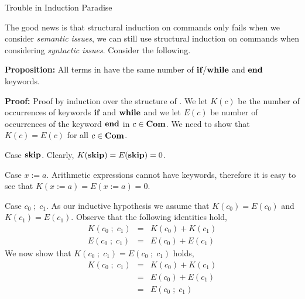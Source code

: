\documentclass{beamer}
\begin{document}
\begin{frame}[fragile]{Trouble in Induction Paradise}

\scriptsize
The good news is that structural induction on commands only fails when we consider {\em semantic issues}, we
can still use structural induction on commands when considering {\em syntactic issues}.  Consider the following.

\vspace{.1in}
{\bf Proposition:}  All terms in  have the same number of $\mbox{\bf if}$/$\mbox{\bf while}$ and $\mbox{\bf end}$
keywords.

\vspace{.1in}
{\bf Proof:} Proof by induction over the structure of .  We let $K(c)$ be the number of
occurrences of keywords $\mbox{\bf if}$ and $\mbox{\bf while}$ and we let $E(c)$
be number of occurrences of the keyword $\mbox{\bf end}$ in $c\in\mbox{\bf Com}$.  We need to show that
$K(c) = E(c)$ for all $c\in\mbox{\bf Com}$.

\vspace{.1in}
Case $\mbox{\bf skip}$.  Clearly, $K(\mbox{\bf skip}) = E(\mbox{\bf skip}) = 0$.

\vspace{.1in}
Case $x := a$. Arithmetic expressions cannot have keywords, therefore it is easy to see that  $K(x := a) = E(x := a) = 0$.

\vspace{.1in}
Case $c_0 \; ; \; c_1$.  As our inductive hypothesis we assume that $K(c_0) = E(c_0)$ and $K(c_1) = E(c_1) $.  Observe that the following identities hold,
\begin{eqnarray*}
K(c_0 \; ; \; c_1) &=& K(c_0) + K(c_1)\\
E(c_0 \; ; \; c_1) &=& E(c_0) + E(c_1)
\end{eqnarray*}
We now show that
$
K(c_0 \; ; \; c_1) = E(c_0 \; ; \; c_1)
$
holds,
\begin{eqnarray*}
K(c_0 \; ; \; c_1) &=& K(c_0) + K(c_1)\\ 
	&=& E(c_0) + E(c_1)\\
	&=&E(c_0 \; ; \; c_1)
\end{eqnarray*}
\end{frame}
\end{document}
